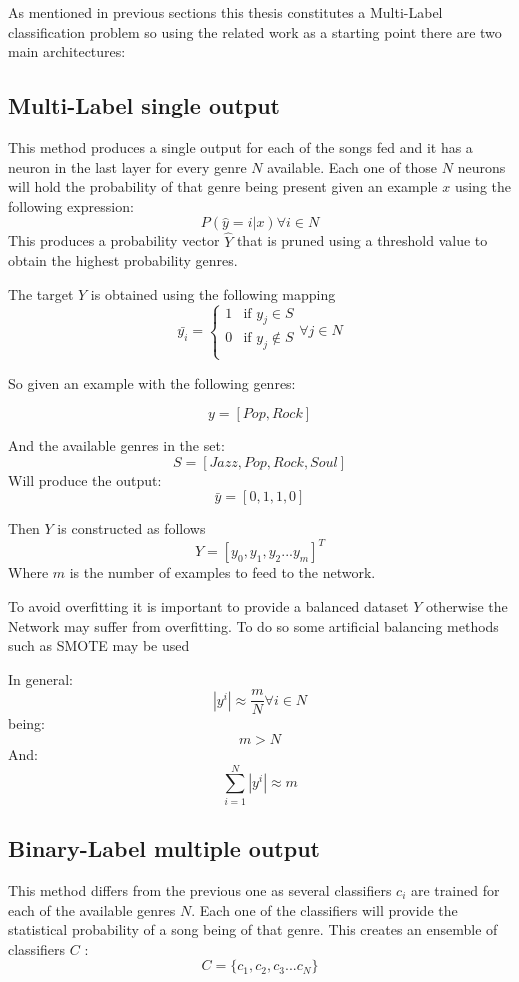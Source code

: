 As mentioned in previous sections this thesis constitutes a Multi-Label classification problem so using the related work as a starting point there are two main architectures:

\subsection{Multi-Label single output}
This method produces a single output for each of the songs fed and it has a neuron in the last layer for every genre $N$ available. Each one of those \(N\) neurons will hold the probability of that genre being present given an example \(x\) using the following expression:
$$ P(\hat{y} = i | x) \forall i \in N$$
This produces a probability vector $\hat{Y}$ that is pruned using a threshold value to obtain the highest probability genres.

The target $Y$ is obtained using the following mapping
$$
\bar{y_i} =
\begin{cases} 
    1 & \text{if } y_j \in S\\
    0 & \text{if } y_j \notin S\\
\end{cases}
\forall j \in N
$$

So given an example with the following genres:

$$ y  = [ Pop, Rock ]$$

And the available genres in the set:
$$ S  = [Jazz, Pop, Rock, Soul]$$
Will produce the output:
$$ \bar{y}  = [0, 1, 1, 0]$$

Then $Y$  is constructed as follows
$$ Y = [y_0, y_1, y_2 ... y_m]^T$$
Where $m$ is the number of examples to feed to the network.

To avoid overfitting it is important to provide a balanced dataset $Y$ otherwise the Network may suffer from overfitting.
To do so some artificial balancing methods such as SMOTE\cite{Chawla2002} \cite{Blagus2013} may be used

In general:
$$ |y^i| \approx \frac{m}{N}   \forall i \in N $$
being:
$$ m > N $$
And:
$$ \sum_{i=1}^{N} |y^i| \approx m $$

\subsection{Binary-Label multiple output}
This method differs from the previous one as several classifiers $c_i$ are trained for each of the available genres $N$. Each one of the classifiers will provide the statistical probability of a song being of that genre.
This creates an ensemble of classifiers $C$ :
$$ C = \{c_1, c_2, c_3 ... c_N\} $$ 

